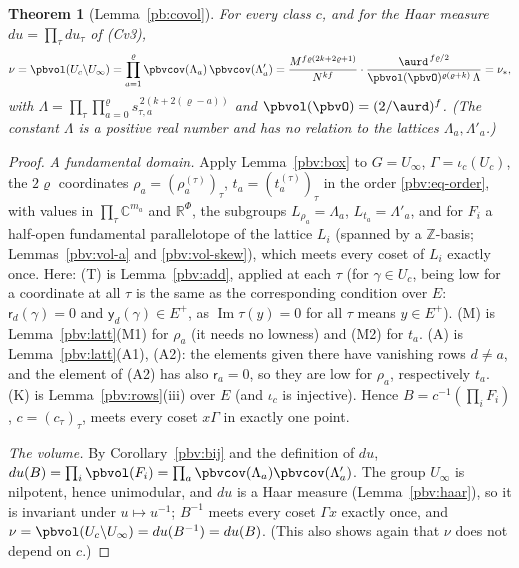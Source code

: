 \documentclass[10pt]{amsart}
\newtheorem{theorem}{Theorem}[section]
\theoremstyle{definition}
\theoremstyle{remark}
\newcommand{\C}{\mathbb C}
\newcommand{\R}{\mathbb R}
\newcommand{\Z}{\mathbb Z}
\newcommand{\Iml}{\operatorname{Im}}
\providecommand{\auPl}{\Phi}
\begin{document}
\begin{theorem}[Lemma~\ref{pb:covol}]\label{pbv:covol}
For every class $c$, and for the Haar measure $du=\prod_\tau du_\tau$ of \textup{(Cv3)},
\[
\nu=\pbvol(U_c\backslash U_\infty)=\prod_{a=1}^{\varrho}\pbvcov(\Lambda_a)\,\pbvcov(\Lambda'_a)=
\frac{M^{f\varrho(2k+2\varrho+1)}}{N^{kf}}\cdot\frac{\aurd^{\,f\varrho/2}}{\pbvol(\pbvO)^{\varrho(\varrho+k)}\,
\Lambda}=\nu_*,
\]
with $\Lambda=\prod_\tau\prod_{a=0}^{\varrho}s_{\tau,a}^{\,2(k+2(\varrho-a))}$ and $\pbvol(\pbvO)=(2/\aurd)^f$. (The constant $\Lambda$ is a positive real number and has no relation to the lattices $\Lambda_a,\Lambda'_a$.)
\end{theorem}
\begin{proof}
\emph{A fundamental domain.} Apply Lemma~\ref{pbv:box} to $G=U_\infty$, $\Gamma=\iota_c(U_c)$, the
$2\varrho$ coordinates $\rho_a=(\rho_a^{(\tau)})_\tau$, $t_a=(t_a^{(\tau)})_\tau$ in the order
\eqref{pbv:eq-order}, with values in $\prod_\tau\C^{m_a}$ and $\R^{\auPl}$, the subgroups $L_{\rho_a}=\Lambda_a$,
$L_{t_a}=\Lambda'_a$, and for $F_i$ a half-open fundamental parallelotope of the lattice $L_i$ (spanned by
a $\Z$-basis; Lemmas~\ref{pbv:vol-a} and \ref{pbv:vol-skew}), which meets every coset of $L_i$ exactly once.
Here: (T) is Lemma~\ref{pbv:add}, applied at each $\tau$ (for $\gamma\in U_c$, being low for a coordinate
at all $\tau$ is the same as the corresponding condition over $E$: $\mathsf r_d(\gamma)=0$ and $\mathsf
y_d(\gamma)\in E^+$, as $\Iml\tau(y)=0$ for all $\tau$ means $y\in E^+$). (M) is Lemma~\ref{pbv:latt}(M1)
for $\rho_a$ (it needs no lowness) and (M2) for $t_a$. (A) is Lemma~\ref{pbv:latt}(A1), (A2): the elements
given there have vanishing rows $d\ne a$, and the element of (A2) has also $\mathsf r_a=0$, so they are low
for $\rho_a$, respectively $t_a$. (K) is Lemma~\ref{pbv:rows}(iii) over $E$ (and $\iota_c$ is injective).
Hence $B=c^{-1}(\prod_iF_i)$, $c=(c_\tau)_\tau$, meets every coset $x\Gamma$ in exactly one point.

\emph{The volume.} By Corollary~\ref{pbv:bij} and the definition of $du$, $du(B)=\prod_i\pbvol(F_i)=
\prod_a\pbvcov(\Lambda_a)\pbvcov(\Lambda'_a)$. The group $U_\infty$ is nilpotent, hence unimodular, and $du$ is a
Haar measure (Lemma~\ref{pbv:haar}), so it is invariant under $u\mapsto u^{-1}$; $B^{-1}$ meets every coset $\Gamma x$ exactly
once, and $\nu=\pbvol(U_c\backslash U_\infty)=du(B^{-1})=du(B)$. (This also shows again that $\nu$ does not
depend on $c$.)


\end{proof}
\end{document}
